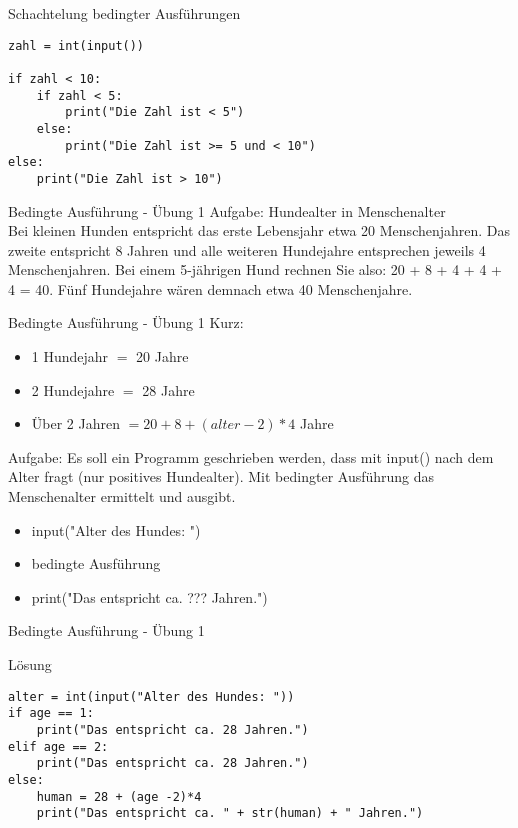 \begin{frame}[fragile]{Schachtelung bedingter Ausführungen}

\begin{lstlisting}
zahl = int(input())

if zahl < 10:
	if zahl < 5:
		print("Die Zahl ist < 5")
	else:
		print("Die Zahl ist >= 5 und < 10")
else:
	print("Die Zahl ist > 10")
\end{lstlisting}
\end{frame}


\begin{frame}{Bedingte Ausführung - Übung 1}
Aufgabe: Hundealter in Menschenalter\\
Bei kleinen Hunden entspricht das erste Lebensjahr etwa 20 Menschenjahren. Das zweite entspricht 8 Jahren und alle weiteren Hundejahre entsprechen jeweils 4 Menschenjahren. Bei einem 5-jährigen Hund rechnen Sie also: 20 + 8 + 4 + 4 + 4 = 40. Fünf Hundejahre wären demnach etwa 40 Menschenjahre.\\
\end{frame}
\begin{frame}{Bedingte Ausführung - Übung 1}
Kurz:
\begin{itemize}
\item 1 Hundejahr $=$ 20 Jahre
\item 2 Hundejahre $=$ 28 Jahre
\item Über 2 Jahren $= 20 + 8 + (alter - 2)  *  4$ Jahre
\end{itemize}
Aufgabe:
Es soll ein Programm geschrieben werden, dass mit input() nach dem Alter fragt (nur positives Hundealter). Mit bedingter Ausführung das Menschenalter ermittelt und ausgibt.
\begin{itemize}
	\item input("Alter des Hundes: ")
	\item bedingte Ausführung
	\item print("Das entspricht ca. ??? Jahren.")
\end{itemize}

\end{frame}

\begin{frame}[fragile]{Bedingte Ausführung - Übung 1 }
\begin{exampleblock}{Lösung}
\begin{lstlisting}
alter = int(input("Alter des Hundes: "))
if age == 1:
	print("Das entspricht ca. 28 Jahren.")
elif age == 2:
	print("Das entspricht ca. 28 Jahren.")
else:
	human = 28 + (age -2)*4
	print("Das entspricht ca. " + str(human) + " Jahren.")
\end{lstlisting}
\end{exampleblock}
\end{frame}



